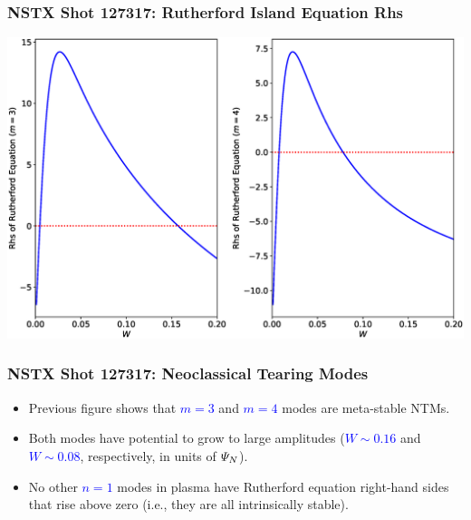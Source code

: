 \documentclass{beamer}
\newcommand{\blue}[1]{\textcolor{blue}{#1}}
\begin{document}
\begin{frame}
\frametitle{NSTX Shot 127317: Rutherford Island Equation Rhs}

\begin{center}
\includegraphics[width=\textwidth]{Rhs.eps}
\end{center}
\end{frame}

\begin{frame}
\frametitle{NSTX Shot 127317: Neoclassical Tearing Modes}

\begin{itemize}
\item Previous figure shows that \blue{$m=3$} and \blue{$m=4$} modes are meta-stable NTMs.
\item Both modes have potential to grow to large amplitudes (\blue{$W\sim 0.16$} and \blue{$W\sim 0.08$}, respectively,  in units
of \blue{${\mit\Psi}_N$}). 
\item No other \blue{$n=1$} modes in plasma have Rutherford equation right-hand sides that rise above zero (i.e.,
they are all intrinsically stable).
\end{itemize}
\end{frame}
\end{document}
